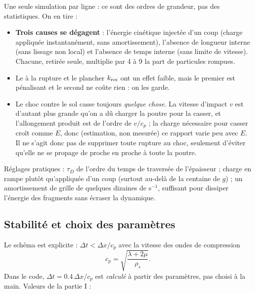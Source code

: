 \documentclass[11pt,a4paper]{article}
\newcommand{\code}[1]{\texttt{\detokenize{#1}}}
\begin{document}
Une seule simulation par ligne : ce sont des ordres de grandeur, pas des statistiques. On en tire :
\begin{itemize}
  \item \textbf{Trois causes se dégagent} : l'énergie cinétique injectée d'un coup
        (charge appliquée instantanément, sans amortissement), l'absence de longueur interne
        (sans lissage non local) et l'absence de temps interne (sans limite de vitesse).
        Chacune, retirée seule, multiplie par 4 à 9 la part de particules rompues.
  \item Le \code{F = I} à la rupture et le plancher $k_{\rm res}$ ont un effet faible, mais le
        premier est pénalisant et le second ne coûte rien : on les garde.
  \item Le choc contre le sol casse toujours \emph{quelque chose}. La vitesse d'impact $v$ est
        d'autant plus grande qu'on a dû charger la poutre pour la casser, et l'allongement produit
        est de l'ordre de $v/c_p$ ; la charge nécessaire pour casser croît comme $E$, donc
        (estimation, non mesurée) ce rapport varie peu avec $E$. Il ne s'agit donc pas de supprimer toute rupture au choc, seulement d'éviter
        qu'elle ne se propage de proche en proche à toute la poutre.
\end{itemize}

Réglages pratiques : $\tau_D$ de l'ordre du temps de traversée de l'épaisseur ; charge en rampe
plutôt qu'appliquée d'un coup (surtout au-delà de la centaine de $g$) ; un amortissement de grille
de quelques dizaines de s$^{-1}$, suffisant pour dissiper l'énergie des fragments sans écraser la
dynamique.

\subsection{Stabilité et choix des paramètres}
\label{sec:stab}

Le schéma est explicite : $\Delta t < \Delta x / c_p$ avec la vitesse des ondes de compression
\[
  c_p = \sqrt{\frac{\lambda + 2\mu}{\rho_s}}.
\]
Dans le code, $\Delta t = 0.4\,\Delta x/c_p$ est \emph{calculé} à partir des paramètres, pas
choisi à la main. Valeurs de la partie I :
\end{document}
